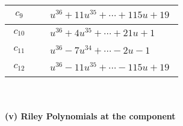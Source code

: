 \documentclass[1p]{elsarticle_modified}
\theoremstyle{definition}
\begin{document}
\begin{tabular}{m{50pt}|m{274pt}}
\hline $$\begin{aligned}c_{9}\end{aligned}$$&$\begin{aligned}
&u^{36}+11 u^{35}+\cdots+115 u+19
\end{aligned}$\\
\hline $$\begin{aligned}c_{10}\end{aligned}$$&$\begin{aligned}
&u^{36}+4 u^{35}+\cdots+21 u+1
\end{aligned}$\\
\hline $$\begin{aligned}c_{11}\end{aligned}$$&$\begin{aligned}
&u^{36}-7 u^{34}+\cdots-2 u-1
\end{aligned}$\\
\hline $$\begin{aligned}c_{12}\end{aligned}$$&$\begin{aligned}
&u^{36}-11 u^{35}+\cdots-115 u+19
\end{aligned}$\\
\hline
\end{tabular}\\~\\
\newpage\renewcommand{\arraystretch}{1}
\flushleft \textbf{(v) Riley Polynomials at the component}\newline \\
\end{document}

